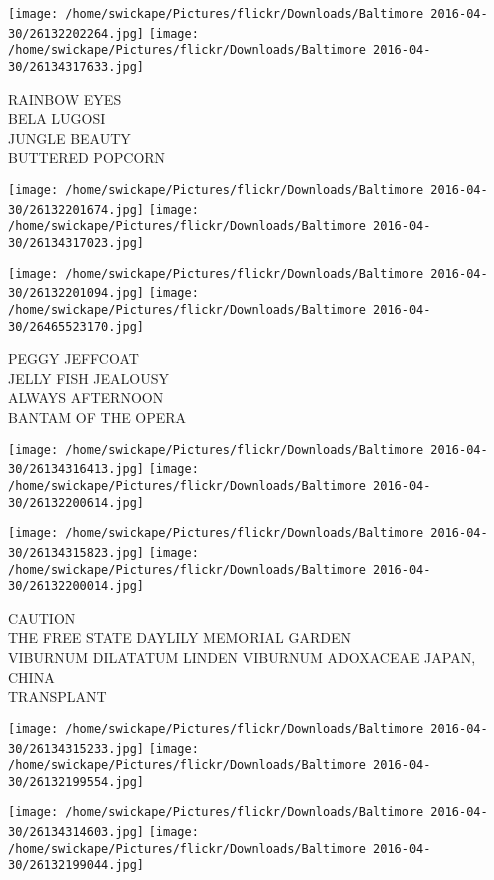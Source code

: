 \documentclass[10pt,letterpaper]{article}
\begin{document}
\texttt{[image: /home/swickape/Pictures/flickr/Downloads/Baltimore 2016-04-30/26132202264.jpg]}
\texttt{[image: /home/swickape/Pictures/flickr/Downloads/Baltimore 2016-04-30/26134317633.jpg]}

RAINBOW EYES\\
BELA LUGOSI\\
JUNGLE BEAUTY\\
BUTTERED POPCORN\\
\pagebreak

\texttt{[image: /home/swickape/Pictures/flickr/Downloads/Baltimore 2016-04-30/26132201674.jpg]}
\texttt{[image: /home/swickape/Pictures/flickr/Downloads/Baltimore 2016-04-30/26134317023.jpg]}

\texttt{[image: /home/swickape/Pictures/flickr/Downloads/Baltimore 2016-04-30/26132201094.jpg]}
\texttt{[image: /home/swickape/Pictures/flickr/Downloads/Baltimore 2016-04-30/26465523170.jpg]}

PEGGY JEFFCOAT\\
JELLY FISH JEALOUSY\\
ALWAYS AFTERNOON\\
BANTAM OF THE OPERA\\
\pagebreak

\texttt{[image: /home/swickape/Pictures/flickr/Downloads/Baltimore 2016-04-30/26134316413.jpg]}
\texttt{[image: /home/swickape/Pictures/flickr/Downloads/Baltimore 2016-04-30/26132200614.jpg]}

\texttt{[image: /home/swickape/Pictures/flickr/Downloads/Baltimore 2016-04-30/26134315823.jpg]}
\texttt{[image: /home/swickape/Pictures/flickr/Downloads/Baltimore 2016-04-30/26132200014.jpg]}

CAUTION\\
THE FREE STATE DAYLILY MEMORIAL GARDEN\\
VIBURNUM DILATATUM LINDEN VIBURNUM ADOXACEAE JAPAN, CHINA\\
TRANSPLANT\\
\pagebreak

\texttt{[image: /home/swickape/Pictures/flickr/Downloads/Baltimore 2016-04-30/26134315233.jpg]}
\texttt{[image: /home/swickape/Pictures/flickr/Downloads/Baltimore 2016-04-30/26132199554.jpg]}

\texttt{[image: /home/swickape/Pictures/flickr/Downloads/Baltimore 2016-04-30/26134314603.jpg]}
\texttt{[image: /home/swickape/Pictures/flickr/Downloads/Baltimore 2016-04-30/26132199044.jpg]}
\end{document}
